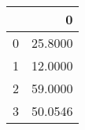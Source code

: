 \begin{tabular}{lr}
\toprule
{} &        0 \\
\midrule
0 &  25.8000 \\
1 &  12.0000 \\
2 &  59.0000 \\
3 &  50.0546 \\
\bottomrule
\end{tabular}
